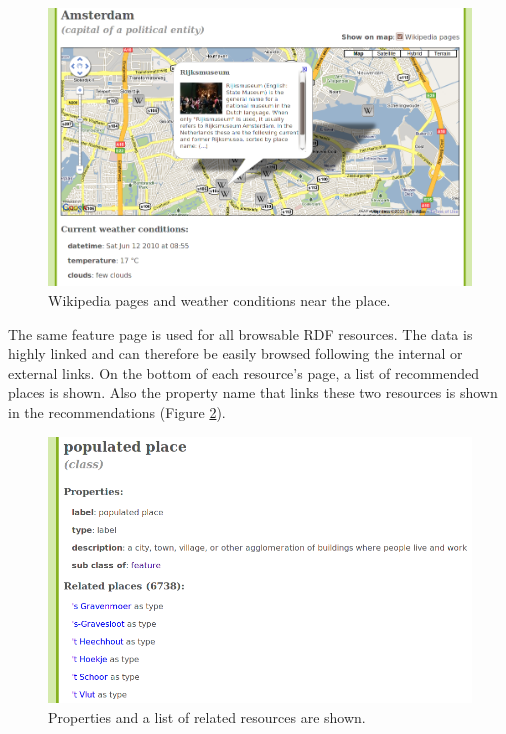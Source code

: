 \documentclass[a4paper,12pt]{article}
\begin{document}
\begin{figure}[h]
  \includegraphics[width=\linewidth]{img/feature.png}
  \caption{Wikipedia pages and weather conditions near the place.}
  \label{feature}
\end{figure}

\noindent The same feature page is used for all browsable RDF
resources. The data is highly linked and can therefore be easily
browsed following the internal or external links. On the bottom of
each resource's page, a list of recommended places is shown. Also the
property name that links these two resources is shown in the
recommendations (Figure \ref{recommendations}).

\begin{figure}[h]
  \includegraphics[width=\linewidth]{img/recommendations.png}
  \caption{Properties and a list of related resources are shown.}
  \label{recommendations}
\end{figure}
\end{document}
